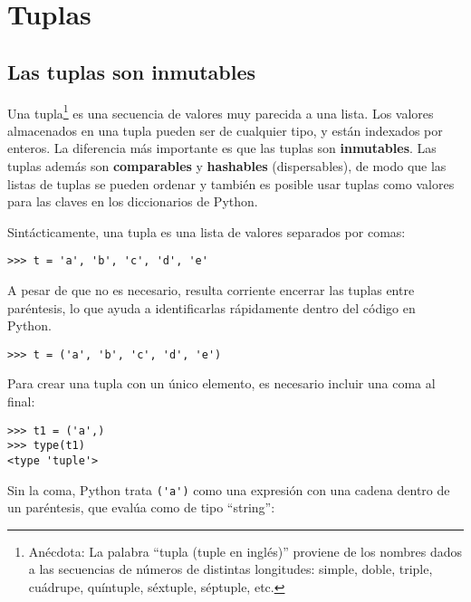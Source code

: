 
\chapter{Tuplas}
\label{tuplechap}

\section{Las tuplas son inmutables}


Una tupla\footnote{Anécdota: La palabra ``tupla (tuple en inglés)'' proviene de los nombres
dados a las secuencias de números de distintas longitudes: simple,
doble, triple, cuádrupe, quíntuple, séxtuple, séptuple, etc.}
es una secuencia de valores muy parecida a una lista.
Los valores almacenados en una tupla pueden ser de cualquier tipo, y
están indexados por enteros.
La diferencia más importante es que las tuplas son {\bf inmutables}.
Las tuplas además son {\bf comparables} y {\bf hashables} (dispersables), de modo que
las listas de tuplas se pueden ordenar y también es posible usar tuplas
como valores para las claves en los diccionarios de Python.


Sintácticamente, una tupla es una lista de valores separados por comas:

\beforeverb
\begin{verbatim}
>>> t = 'a', 'b', 'c', 'd', 'e'
\end{verbatim}
\afterverb
%
A pesar de que no es necesario, resulta corriente encerrar las tuplas entre
paréntesis, lo que ayuda a identificarlas rápidamente dentro del
código en Python.


\beforeverb
\begin{verbatim}
>>> t = ('a', 'b', 'c', 'd', 'e')
\end{verbatim}
\afterverb
%
Para crear una tupla con un único elemento, es necesario incluir una coma
al final:


\beforeverb
\begin{verbatim}
>>> t1 = ('a',)
>>> type(t1)
<type 'tuple'>
\end{verbatim}
\afterverb
%
Sin la coma, Python trata \verb"('a')" como una expresión con una
cadena dentro de un paréntesis, que evalúa como de tipo ``string'':

